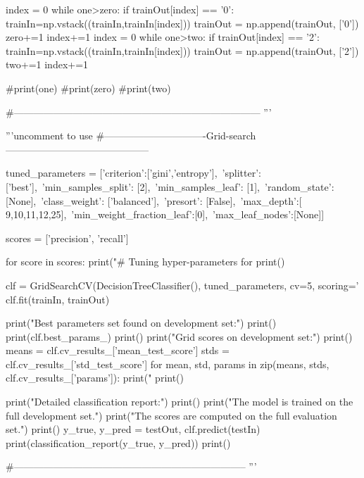 \documentclass[12pt]{article}
\begin{document}
\begin{python}
index = 0
while one>zero:
    if trainOut[index] == '0':
        trainIn=np.vstack((trainIn,trainIn[index]))
        trainOut = np.append(trainOut, ['0'])
        zero+=1
    index+=1
index = 0
while one>two:
    if trainOut[index] == '2':
        trainIn=np.vstack((trainIn,trainIn[index]))
        trainOut = np.append(trainOut, ['2'])
        two+=1
    index+=1

#print(one)
#print(zero)
#print(two)

#---------------------------------------------------------------------------
'''


'''uncomment to use
#-------------------------------Grid-search--------------------------------------------

tuned_parameters = [{'criterion':['gini','entropy'],\
                    'splitter':['best'],\
                    'min_samples_split': [2],\
                    'min_samples_leaf': [1],\
                    'random_state': [None],\
                    'class_weight': ['balanced'],\
                    'presort': [False],\
                    'max_depth':[ 9,10,11,12,25],\
                    'min_weight_fraction_leaf':[0],\
                    'max_leaf_nodes':[None]}]


scores = ['precision', 'recall']

for score in scores:
    print("# Tuning hyper-parameters for %
    print()

    clf = GridSearchCV(DecisionTreeClassifier(), tuned_parameters, cv=5,
                       scoring='%
    clf.fit(trainIn, trainOut)

    print("Best parameters set found on development set:")
    print()
    print(clf.best_params_)
    print()
    print("Grid scores on development set:")
    print()
    means = clf.cv_results_['mean_test_score']
    stds = clf.cv_results_['std_test_score']
    for mean, std, params in zip(means, stds, clf.cv_results_['params']):
        print("%
    print()

    print("Detailed classification report:")
    print()
    print("The model is trained on the full development set.")
    print("The scores are computed on the full evaluation set.")
    print()
    y_true, y_pred = testOut, clf.predict(testIn)
    print(classification_report(y_true, y_pred))
    print()



#-----------------------------------------------------------------------
'''






\end{python}
\end{document}
